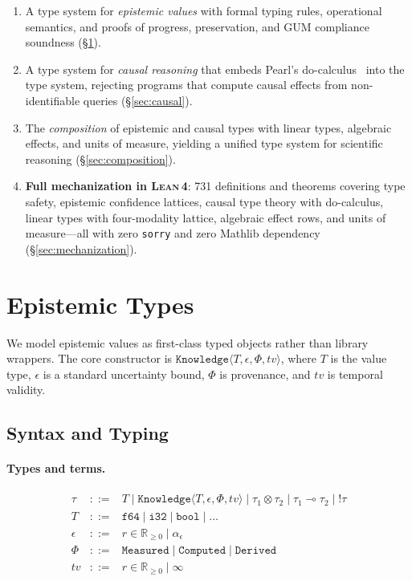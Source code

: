 \documentclass[acmsmall,screen,review,anonymous]{acmart}
\newcommand{\knowfull}[4]{\texttt{Knowledge}\langle #1, #2, #3, #4 \rangle}
\newcommand{\eps}{\epsilon}
\newcommand{\lean}{\textsc{Lean\,4}\xspace}
\begin{document}
\begin{enumerate}
  \item A type system for \emph{epistemic values} with formal typing
        rules, operational semantics, and proofs of progress,
        preservation, and GUM compliance soundness
        (\S\ref{sec:epistemic}).

  \item A type system for \emph{causal reasoning} that embeds Pearl's
        do-calculus~\cite{pearl2009causality} into the type system,
        rejecting programs that compute causal effects from
        non-identifiable queries (\S\ref{sec:causal}).

  \item The \emph{composition} of epistemic and causal types with
        linear types, algebraic effects, and units of measure,
        yielding a unified type system for scientific reasoning
        (\S\ref{sec:composition}).

  \item \textbf{Full mechanization in \lean}: 731 definitions and
        theorems covering type safety, epistemic confidence lattices,
        causal type theory with do-calculus, linear types with
        four-modality lattice, algebraic effect rows, and units of
        measure---all with zero \texttt{sorry} and zero Mathlib
        dependency (\S\ref{sec:mechanization}).
\end{enumerate}

\section{Epistemic Types}
\label{sec:epistemic}

We model epistemic values as first-class typed objects rather than
library wrappers.
The core constructor is $\knowfull{T}{\eps}{\Phi}{\mathit{tv}}$, where
$T$ is the value type, $\eps$ is a standard uncertainty bound, $\Phi$
is provenance, and $\mathit{tv}$ is temporal validity.

\subsection{Syntax and Typing}

\paragraph{Types and terms.}
\[
\begin{array}{rcl}
\tau & ::= & T \mid \knowfull{T}{\eps}{\Phi}{\mathit{tv}}
         \mid \tau_1 \otimes \tau_2 \mid \tau_1 \multimap \tau_2 \mid !\tau \\
T & ::= & \texttt{f64} \mid \texttt{i32} \mid \texttt{bool} \mid \ldots \\
\eps & ::= & r \in \mathbb{R}_{\ge 0} \mid \alpha_\eps \\
\Phi & ::= & \texttt{Measured} \mid \texttt{Computed} \mid \texttt{Derived} \\
\mathit{tv} & ::= & r \in \mathbb{R}_{\ge 0} \mid \infty
\end{array}
\]
\end{document}

